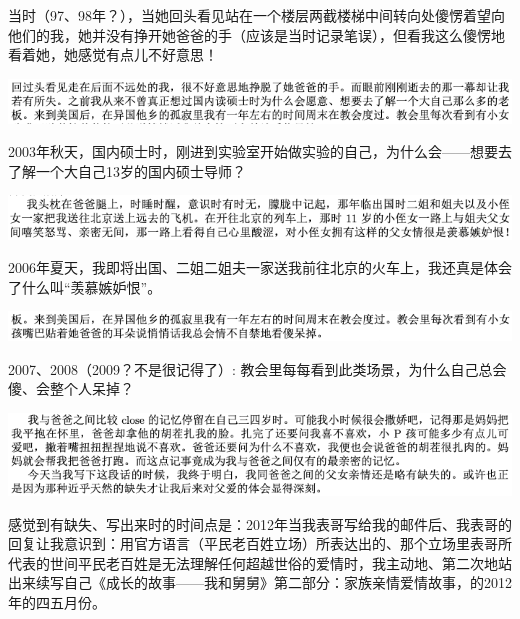\documentclass[9pt, b5paper]{article}
\begin{document}
当时（97、98年？），当她回头看见站在一个楼层两截楼梯中间转向处傻愣着望向他们的我，她并没有挣开她爸爸的手（应该是当时记录笔误），但看我这么傻愣地看着她，她感觉有点儿不好意思！

\begin{center}
\includegraphics[width=.9\linewidth]{./pic/backups_plans_20210423_110746.png}
\end{center}

2003年秋天，国内硕士时，刚进到实验室开始做实验的自己，为什么会——想要去了解一个大自己13岁的国内硕士导师？

\begin{center}
\includegraphics[width=.9\linewidth]{./pic/backups_plans_20210423_104428.png}
\end{center}

2006年夏天，我即将出国、二姐二姐夫一家送我前往北京的火车上，我还真是体会了什么叫“羡慕嫉妒恨”。

\begin{center}
\includegraphics[width=.9\linewidth]{./pic/backups_plans_20210423_110834.png}
\end{center}

2007、2008（2009？不是很记得了）: 教会里每每看到此类场景，为什么自己总会傻、会整个人呆掉？

\begin{center}
\includegraphics[width=.9\linewidth]{./pic/backups_plans_20210423_105443.png}
\end{center}

感觉到有缺失、写出来时的时间点是：2012年当我表哥写给我的邮件后、我表哥的回复让我意识到：用官方语言（平民老百姓立场）所表达出的、那个立场里表哥所代表的世间平民老百姓是无法理解任何超越世俗的爱情时，我主动地、第二次地站出来续写自己《成长的故事——我和舅舅》第二部分：家族亲情爱情故事，的2012年的四五月份。
\end{document}
